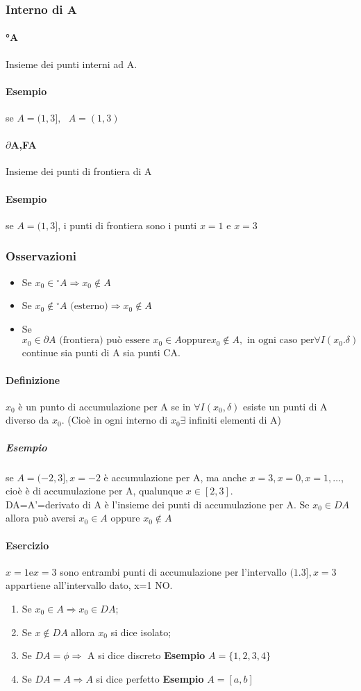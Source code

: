 \subsubsection{Interno di A}
\paragraph{°A} Insieme dei punti interni ad A.
\paragraph{Esempio} se $A=(1,3],\text{ }A=(1,3)$
\paragraph{$\partial$A,FA} Insieme dei punti di frontiera di A
\paragraph{Esempio} se $A=(1,3]$, i punti di frontiera sono i punti $x=1$ e
$x=3$
\subsubsection{Osservazioni}
\begin{itemize}
	\item Se $x_0\in {^\circ A}\Rightarrow x_0\notin A$
	\item Se $x_0\notin {^\circ A} \text{ (esterno)} \Rightarrow x_0\notin A$
	\item Se $x_0\in\partial A \text{ (frontiera) può essere }x_0\in A \text{
			oppure} x_0 \notin A, \text{ in ogni caso per} \forall
		I(x_0.\delta) $ continue sia punti di A sia punti CA.
\end{itemize}
\paragraph{Definizione}
$x_0$ è un punto di accumulazione per A se in $\forall I(x_0,\delta)$ esiste un
punti di A diverso da $x_0$. (Cioè in ogni interno di $x_0 \exists$ infiniti
elementi di A)
\subparagraph{Esempio} se $A=(-2,3],x=-2$ è accumulazione per A, ma anche
$x=3,x=0,x=1,\dots$, cioè è di accumulazione per A, qualunque $x\in [2,3]$.\\
DA=A'=derivato di A è l'insieme dei punti di accumulazione per A. Se $x_0\in
DA$ allora può aversi $x_0\in A$ oppure $x_0\notin A$
\paragraph{Esercizio} $x=1 \text{e} x=3$ sono entrambi punti di accumulazione
per l'intervallo $(1.3],x=3$ appartiene all'intervallo dato, x=1 NO.
\begin{enumerate}
	\item Se $x_0\in A \Rightarrow x_0\in DA$;
	\item Se $x\notin DA$ allora $x_0$ si dice isolato;
	\item Se $DA=\phi\Rightarrow$ A si dice discreto \textbf{Esempio}
		$A=\{1,2,3,4\}$
	\item Se $DA=A\Rightarrow A$ si dice perfetto \textbf{Esempio} $A=[a,b]$
\end{enumerate}
